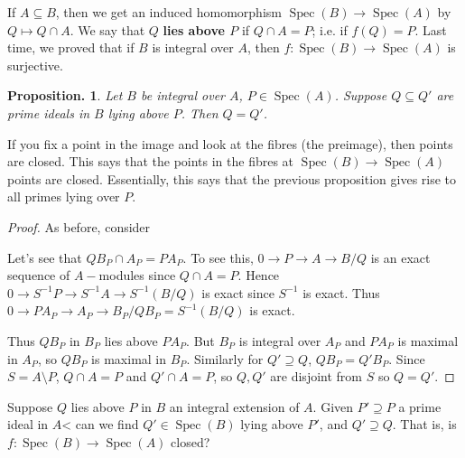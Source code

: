\documentclass[11pt, a4paper]{memoir}
\newcommand{\lto}[0]{\ensuremath{\longrightarrow}}
\theoremstyle{change}
\newtheorem{proposition}[theorem]{Proposition.}
\theoremstyle{plain}
\theoremstyle{nonumberplain}
\newtheorem{proof}{Proof}
\DeclareMathOperator{\Spec}{Spec}
\numberwithin{equation}{section}
\begin{document}
If $A\subseteq B$, then we get an induced homomorphism $\Spec(B)\to\Spec(A)$ by $Q\mapsto Q\cap A$.
We say that $Q$ \textbf{lies above $P$} if $Q\cap A=P$; i.e. if $f(Q)=P$.
Last time, we proved that if $B$ is integral over $A$, then $f:\Spec(B)\to\Spec(A)$ is surjective.
\begin{proposition}
    Let $B$ be integral over $A$, $P\in\Spec(A)$.
    Suppose $Q\subseteq Q'$ are prime ideals in $B$ lying above $P$.
    Then $Q=Q'$.
\end{proposition}
If you fix a point in the image and look at the fibres (the preimage), then points are closed.
This says that the points in the fibres at $\Spec(B)\to\Spec(A)$ points are closed.
Essentially, this says that the previous proposition gives rise to all primes lying over $P$.
\begin{proof}
    As before, consider
    \begin{center}
    \end{center}
    Let's see that $QB_P\cap A_P=PA_P$.
    To see this, $0\to P\to A\to B/Q$ is an exact sequence of $A-$modules since $Q\cap A=P$.
    Hence $0\lto S^{-1}P\lto S^{-1}A\lto S^{-1}(B/Q)$ is exact since $S^{-1}$ is exact.
    Thus $0\lto PA_P\lto A_P\lto B_P/QB_P=S^{-1}(B/Q)$ is exact.

    Thus $QB_P$ in $B_P$ lies above $PA_P$.
    But $B_P$ is integral over $A_P$ and $PA_P$ is maximal in $A_P$, so $QB_P$ is maximal in $B_P$.
    Similarly for $Q'\supseteq Q$, $QB_P=Q'B_P$.
    Since $S=A\setminus P$, $Q\cap A=P$ and $Q'\cap A=P$, so $Q,Q'$ are disjoint from $S$ so $Q=Q'$.
\end{proof}
Suppose $Q$ lies above $P$ in $B$ an integral extension of $A$.
Given $P'\supseteq P$ a prime ideal in $A$< can we find $Q'\in\Spec(B)$ lying above $P'$, and $Q'\supseteq Q$.
That is, is $f:\Spec(B)\to\Spec(A)$ closed?
\end{document}
